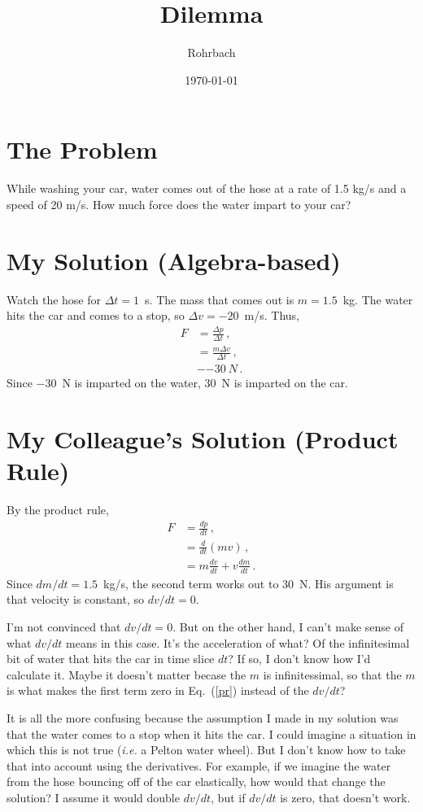 \documentclass[10pt]{exam}
\title{Dilemma}
\author{Rohrbach}
\date{\today}
\begin{document}
\maketitle


\section*{The Problem}

While washing your car, water comes out of the hose at a rate of 1.5 kg/s and a speed of 20 m/s.  How much force does the water impart to your car?

\section*{My Solution (Algebra-based)}

Watch the hose for $\Delta t=1$~s.  The mass that comes out is $m=1.5$~kg.  The water hits the car and comes to a stop, so $\Delta v=-20$~m/s.  Thus,
%
\begin{align}
  F &= \frac{\Delta p}{\Delta t} \,, \\
    &= \frac{m \Delta v}{\Delta t} \, , \\
    &- \SI{-30}{N} \,.
\end{align}
%
Since \SI{-30}{N} is imparted on the water, \SI{30}{N} is imparted on the car.


\section*{My Colleague's Solution (Product Rule)}

By the product rule,
\begin{align}
  F &= \frac{dp}{dt} \,, \\
    &= \frac{d}{dt}\left(mv\right) \,, \\
    &= m \frac{dv}{dt} + v \frac{dm}{dt} \,. \label{pr}
\end{align}
%
Since $dm/dt=1.5$~kg/s, the second term works out to 30~N.  His argument is that velocity is constant, so $dv/dt=0$.

I'm not convinced that $dv/dt=0$.  But on the other hand, I can't make sense of what $dv/dt$ means in this case.  It's the acceleration of what? Of the infinitesimal bit of water that hits the car in time slice $dt$?  If so, I don't know how I'd calculate it.  Maybe it doesn't matter becase the $m$ is infinitessimal, so that the $m$ is what makes the first term zero in Eq.~(\ref{pr}) instead of the $dv/dt$?

It is all the more confusing because the assumption I made in my solution was that the water comes to a stop when it hits the car.  I could imagine a situation in which this is not true (\emph{i.e.} a Pelton water wheel).  But I don't know how to take that into account using the derivatives.  For example, if we imagine the water from the hose bouncing off of the car elastically, how would that change the solution?  I assume it would double $dv/dt$, but if $dv/dt$ is zero, that doesn't work.  
\end{document}
